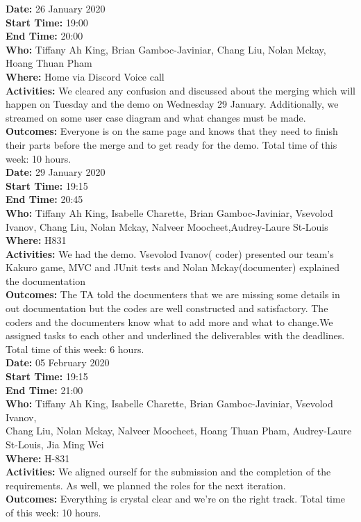 \documentclass[12pt]{article}
\begin{document}
{\bf Date:} 26 January 2020\\
{\bf Start Time:} 19:00\\
{\bf End Time:} 20:00\\
{\bf Who:} Tiffany Ah King, Brian Gamboc-Javiniar,
Chang Liu, Nolan Mckay, Hoang Thuan Pham\\
{\bf Where:} Home via Discord Voice call\\
{\bf Activities:} We cleared any confusion and discussed about the merging which will happen on Tuesday and the demo on Wednesday 29 January. Additionally, we streamed on some user case diagram and what changes must be made.\\
{\bf Outcomes:} Everyone is on the same page and knows that they need to finish their parts before the merge and to get ready for the demo. Total time of this week: 10 hours.\\

{\bf Date:} 29 January 2020\\
{\bf Start Time:} 19:15\\
{\bf End Time:} 20:45\\
{\bf Who:} Tiffany Ah King, Isabelle Charette, Brian Gamboc-Javiniar, Vsevolod Ivanov,
Chang Liu, Nolan Mckay, Nalveer Moocheet,Audrey-Laure St-Louis \\
{\bf Where:} H831\\
{\bf Activities:} We  had the demo. Vsevolod Ivanov( coder) presented our team's Kakuro game, MVC and JUnit tests and Nolan Mckay(documenter) explained the documentation \\
{\bf Outcomes:} The TA told the documenters that we are missing some details in out documentation but the codes are well constructed and satisfactory. The coders and the documenters know what to add more and what to change.We assigned tasks to each other and underlined the deliverables with the deadlines. Total time of this week: 6 hours.\\

{\bf Date:} 05 February 2020\\
{\bf Start Time:} 19:15\\
{\bf End Time:} 21:00\\
{\bf Who:} Tiffany Ah King, Isabelle Charette, Brian Gamboc-Javiniar, Vsevolod Ivanov,\\
Chang Liu, Nolan Mckay, Nalveer Moocheet, Hoang Thuan Pham, Audrey-Laure St-Louis, Jia Ming Wei\\
{\bf Where:} H-831\\
{\bf Activities:} We aligned ourself for the submission and the completion of the requirements. As well, we planned the roles for the next iteration.\\
{\bf Outcomes:} Everything is crystal clear and we're on the right track. Total time of this week: 10 hours.\\
\end{document}
